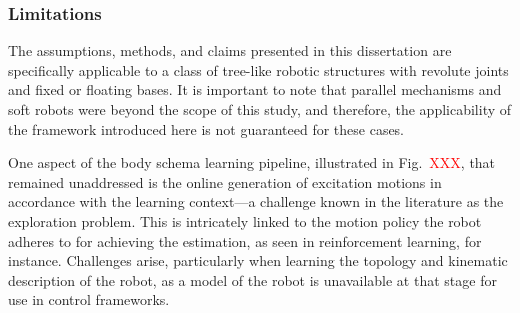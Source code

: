 \documentclass[12pt, a4paper]{article}
\newcommand{\redtext}[1]{\textcolor{red}{#1}}
\begin{document}
\subsubsection*{Limitations}
%
%

The assumptions, methods, and claims presented in this dissertation are specifically applicable to a class of tree-like robotic structures with revolute joints and fixed or floating bases. It is important to note that parallel mechanisms and soft robots were beyond the scope of this study, and therefore, the applicability of the framework introduced here is not guaranteed for these cases.

One aspect of the body schema learning pipeline, illustrated in Fig.~\redtext{XXX}, that remained unaddressed is the online generation of excitation motions in accordance with the learning context—a challenge known in the literature as the exploration problem. This is intricately linked to the motion policy the robot adheres to for achieving the estimation, as seen in reinforcement learning, for instance. Challenges arise, particularly when learning the topology and kinematic description of the robot, as a model of the robot is unavailable at that stage for use in control frameworks.
\end{document}

